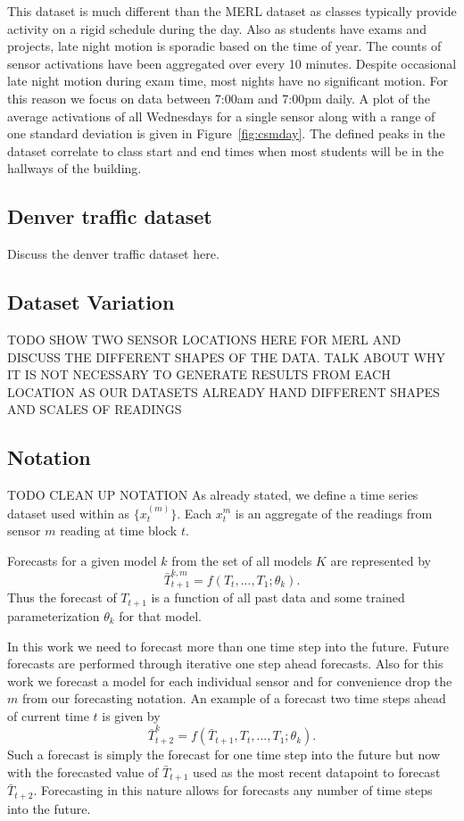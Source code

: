 This dataset is much different than the MERL dataset as classes typically provide activity on a rigid schedule during the day.  Also as students have exams and projects, late night motion is sporadic based on the time of year.  The counts of sensor activations have been aggregated over every 10 minutes.  Despite occasional late night motion during exam time, most nights have no significant motion.  For this reason we focus on data between 7:00am and 7:00pm daily.  A plot of the average activations of all Wednesdays for a single sensor along with a range of one standard deviation is given in Figure~\ref{fig:csmday}.  The defined peaks in the dataset correlate to class start and end times when most students will be in the hallways of the building.

\subsection{Denver traffic dataset}
Discuss the denver traffic dataset here.


\subsection{Dataset Variation}
TODO SHOW TWO SENSOR LOCATIONS HERE FOR MERL AND DISCUSS THE DIFFERENT SHAPES OF THE DATA.  TALK ABOUT WHY IT IS NOT NECESSARY TO GENERATE RESULTS FROM EACH LOCATION AS OUR DATASETS ALREADY HAND DIFFERENT SHAPES AND SCALES OF READINGS

\subsection{Notation}
TODO CLEAN UP NOTATION
As already stated, we define a time series dataset used within as  $\{x_{t}^{(m)}\}$.  Each $x_{t}^{m}$ is an aggregate of the readings from sensor $m$ reading at time block $t$. 

Forecasts for a given model $k$ from the set of all models $K$ are represented by 
\begin{equation}
\bar{T}_{t + 1}^{k, m} = f(T_{t}, ..., T_{1}; \theta_{k}).
\end{equation}
\noindent
Thus the forecast of $T_{t + 1}$ is a function of all past data and some trained parameterization $\theta_{k}$ for that model. 

In this work we need to forecast more than one time step into the future.  Future forecasts are performed through iterative one step ahead forecasts.  Also for this work we forecast a model for each individual sensor and for convenience drop the $m$ from our forecasting notation.  An example of a forecast two time steps ahead of current time $t$ is given by 
\begin{equation}
\bar{T}_{t + 2}^{k} = f(\bar{T}_{t + 1}, T_{t}, ..., T_{1}; \theta_{k}).
\end{equation}
\noindent
Such a forecast is simply the forecast for one time step into the future but now with the forecasted value of $\bar{T}_{t + 1}$ used as the most recent datapoint to forecast $\bar{T}_{t + 2}$.  Forecasting in this nature allows for forecasts any number of time steps into the future. 


